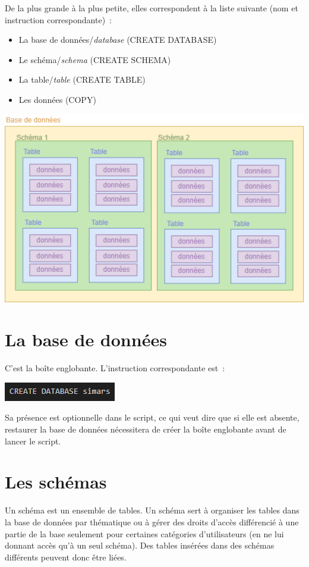 De la plus grande à la plus petite, elles correspondent à la liste
suivante (nom et instruction correspondante)~:

\begin{itemize}
	\item
	La base de données/\emph{database} (CREATE DATABASE)
	\item
	Le schéma/\emph{schema} (CREATE SCHEMA)
	\item
	La table/\emph{table} (CREATE TABLE)
	\item
	Les données (COPY)
\end{itemize}

\includegraphics[width=\textwidth]{annexes/image1.png}

\section*{La base de données}

C'est la boîte englobante. L'instruction correspondante est~:

\includegraphics{annexes/image2.png}

Sa présence est optionnelle dans le script, ce qui veut dire que si elle
est absente, restaurer la base de données nécessitera de créer la boîte
englobante avant de lancer le script.

\section*{Les schémas}

Un schéma est un ensemble de tables. Un schéma sert à organiser les
tables dans la base de données par thématique ou à gérer des droits
d'accès différencié à une partie de la base seulement pour certaines
catégories d'utilisateurs (en ne lui donnant accès qu'à un seul schéma).
Des tables insérées dans des schémas différents peuvent donc être liées.

